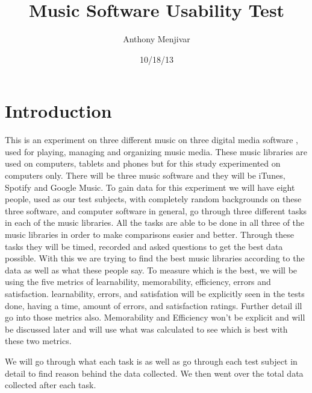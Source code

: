 \documentclass{article}
\title{Music Software Usability Test}
\author{Anthony Menjivar}
\date{10/18/13}
\begin{document}
\maketitle


\section{Introduction}
This is an experiment on three different music on three digital media software , used for playing, managing and organizing music media. These music libraries are used on computers, tablets and phones but for this study experimented on computers only. There will be three music software and they will be iTunes, Spotify and Google Music.  To gain data for this experiment we will have eight people, used as our test subjects, with completely random backgrounds on these three software, and computer software in general, go through three different tasks in each of the music libraries. All the tasks are able to be done in all three of the music libraries in order to make comparisons easier and better. Through these tasks they will be timed, recorded and asked questions to get the best data possible. With this we are trying to find the best  music libraries according to the data as well as what these people say. To measure which is the best, we will be using the five metrics of learnability, memorability, efficiency, errors and satisfaction. learnability, errors, and satisfation will be explicitly seen in the tests done, having a time, amount of errors, and satisfaction ratings. Further detail ill go into those metrics also. Memorability and Efficiency won't be explicit and will be discussed later and  will use what was calculated to see which is best with these two metrics.

We will go through what each task is as well as go through each test subject in detail to find reason behind the data collected. We then went over the total data collected after each task.
\end{document}
